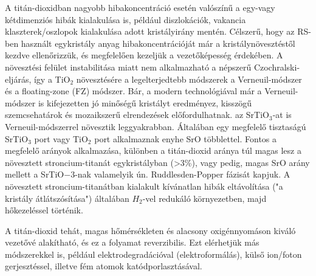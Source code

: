 \documentclass[twoside]{article}
\begin{document}
A titán-dioxidban nagyobb hibakoncentráció esetén valószínű a egy-vagy kétdimenziós hibák kialakulása is, például diszlokációk, vakancia klaszterek/oszlopok kialakulása adott kristályirány mentén. Célszerű, hogy az RS-ben használt egykristály anyag hibakoncentrációját már a kristálynövesztéstől kezdve ellenőrizzük, és megfelelően kezeljük a vezetőképesség érdekében. A növesztési felület instabilitása miatt nem alkalmazható a népszerű Czochralski-eljárás, így a TiO$_2$ növesztésére a legelterjedtebb módszerek a Verneuil-módszer és a floating-zone (FZ) módszer. Bár, a modern technológiával már a Verneuil-módszer is kifejezetten jó minőségű kristályt eredményez, kisszögű szemcsehatárok és mozaikszerű elrendezések előfordulhatnak. az SrTiO$_3$-at is Verneuil-módszerrel növesztik leggyakrabban. Általában egy megfelelő tisztaságú SrTiO$_3$ port vagy TiO$_2$ port alkalmaznak enyhe SrO többlettel. Fontos a megfelelő arányok alkalmazása, különben a titán-dioxid aránya túl magas lesz a növesztett stroncium-titanát egykristályban (>3\%), vagy pedig, magas SrO arány mellett a SrTiO$-3$-nak valamelyik ún. Ruddlesden-Popper fázisát kapjuk. A növesztett stroncium-titanátban kialakult kívánatlan hibák eltávolítása ("a kristály átlátszósítása") általában $H_2$-vel redukáló környezetben, majd hőkezeléssel történik.\cite{szot2014}\par
A titán-dioxid tehát, magas hőmérsékleten és alacsony oxigénnyomáson kiváló vezetővé alakítható, és ez a folyamat reverzibilis. Ezt elérhetjük más módszerekkel is, például elektrodegradációval (elektroformálás), külső ion/foton gerjesztéssel, illetve fém atomok katódporlasztásával.
\end{document}
